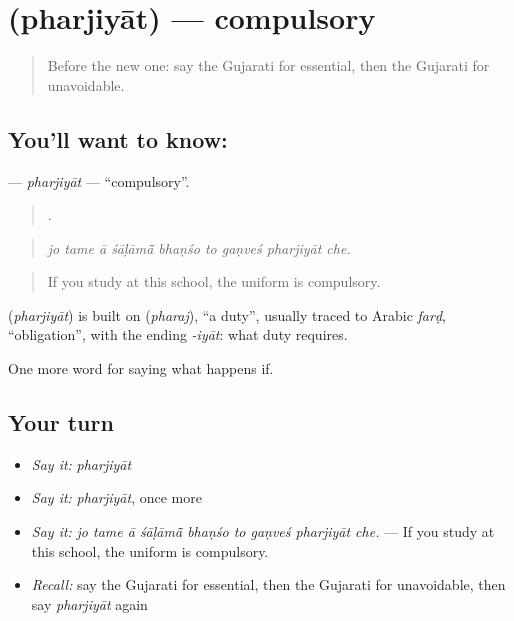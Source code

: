 \section[\texorpdfstring{\gu{ફરજિયાત} (pharjiyāt)}{ફરજિયાત (pharjiyāt)}]{ (pharjiyāt) — compulsory}

\label{lesson:GU-C375-pharjiyat}



\begin{quote}
Before the new one: say the Gujarati for essential, then the Gujarati for unavoidable.
\end{quote}

\subsection*{You'll want to know: }
\textbf{} — \emph{pharjiyāt} — \textquotedblleft{}compulsory\textquotedblright{}.

\begin{quote}
        .
\end{quote}

\begin{quote}
\emph{jo tame ā śāḷāmā̃ bhaṇśo to gaṇveś pharjiyāt che.}
\end{quote}

\begin{quote}
If you study at this school, the uniform is compulsory.
\end{quote}

\begin{cousinweb}
\textbf{} (\emph{pharjiyāt}) is built on \textbf{} (\emph{pharaj}), \textquotedblleft{}a duty\textquotedblright{}, usually traced to Arabic \emph{farḍ}, \textquotedblleft{}obligation\textquotedblright{}, with the ending \emph{-iyāt}: what duty requires.
\end{cousinweb}

\begin{grammarlens}[title={What you've built}]
One more word for saying what happens if.
\end{grammarlens}

\subsection*{Your turn}
\begin{itemize}
\raggedright
  \item \emph{Say it:} \emph{pharjiyāt}
  \item \emph{Say it:} \emph{pharjiyāt}, once more
  \item \emph{Say it:} \emph{jo tame ā śāḷāmā̃ bhaṇśo to gaṇveś pharjiyāt che.} — If you study at this school, the uniform is compulsory.
  \item \emph{Recall:} say the Gujarati for essential, then the Gujarati for unavoidable, then say \emph{pharjiyāt} again
\end{itemize}

